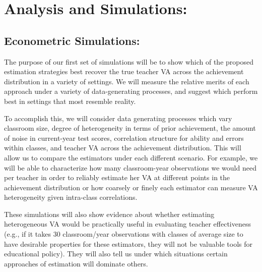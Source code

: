 \documentclass[letterpaper,12pt]{article}
\begin{document}
\section{Analysis and Simulations:}


\subsection{Econometric Simulations:}

The purpose of our first set of simulations will be to show which of the proposed estimation strategies best recover the true teacher VA across the achievement distribution in a variety of settings. We will measure the relative merits of each approach under a variety of data-generating processes, and suggest which perform best in settings that most resemble reality.

To accomplish this, we will consider data generating processes which vary classroom size, degree of heterogeneity in terms of prior achievement, the amount of noise in current-year test scores, correlation structure for ability and errors within classes, and teacher VA across the achievement distribution. This will allow us to compare the estimators under each different scenario. For example, we will be able to characterize how many classroom-year observations we would need per teacher in order to reliably estimate her VA at different points in the achievement distribution or how coarsely or finely each estimator can measure VA heterogeneity given intra-class correlations. 

These simulations will also show evidence about whether estimating heterogeneous VA would be practically useful in evaluating teacher effectiveness (e.g., if it takes 30 classroom/year observations with classes of average size to have desirable properties for these estimators, they will not be valuable tools for educational policy). They will also tell us under which situations certain approaches of estimation will dominate others.



\end{document}
